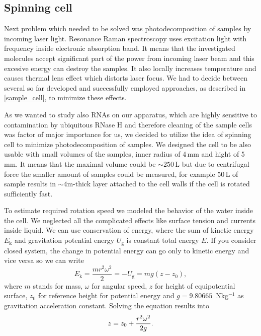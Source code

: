 \subsection{Spinning cell}
\label{spinning_cell}

Next problem which needed to be solved was photodecomposition of samples by
incoming laser light. Resonance Raman spectroscopy uses excitation light
with frequency inside electronic absorption band. It means that the
investigated molecules accept significant part of the power from incoming
laser beam and this excesive energy can destroy the samples. It also locally
increases temperature and causes thermal lens effect which distorts laser
focus. We had to decide between several so far developed and successfully
employed approaches, as described in \cref{sample_cell}, to minimize
these effects.

As we wanted to study also RNAs on our apparatus, which are highly sensitive
to contamination by ubiquitous RNase H and therefore cleaning of the sample
cells was factor of major importance for us, we decided to utilize the idea
of spinning cell to minimize photodecomposition of samples. We designed the
cell to be also usable with small volumes of the samples, inner radius of 4\,mm
and hight of 5\,mm. It means that the maximal volume could be $\sim250$\,L
but due to centrifugal force the smaller amount of samples could be measured,
for example 50\,L of sample results in $\sim 4$m-thick layer attached
to the cell walls if the cell is rotated sufficiently fast.

To estimate required rotation speed we modeled the behavior of the water
inside the cell. We neglected all the complicated effects like surface tension
and currents inside liquid. We can use conservation of energy, where the sum
of kinetic energy $E_\text{k}$ and gravitation potential energy $U_\text{g}$ is
constant total energy $E$. If you consider closed system, the change in
potential energy can go only to kinetic energy and vice versa so we can write
\begin{equation*}
	E_\text{k} = \frac{mr^2\omega^2}{2} = -U_\text{g} = mg(z - z_0),
\end{equation*}
where $m$ stands for mass, $\omega$ for angular speed, $z$ for height of
equipotential surface, $z_0$ for reference height for potential energy and
$g = 9.80665$\, Nkg$^{-1}$ as gravitation acceleration constant. Solving the
equation results into
\begin{equation}
	z = z_0 + \frac{r^2\omega^2}{2g}.
	\label{\eqnlabel{spinning_cell:liquid_surface}}
\end{equation}

